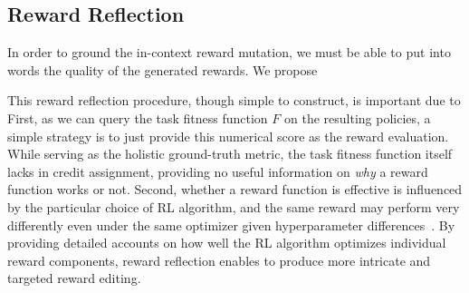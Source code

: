 \subsection{Reward Reflection}
\label{sec:reward-reflection}
In order to ground the in-context reward mutation, we must be able to put into words the quality of the generated rewards. We propose 







This reward reflection procedure, though simple to construct, is important due to  First, as we can query the task fitness function $F$ on the resulting policies, a simple strategy is to just provide this numerical score as the reward evaluation. While serving as the holistic ground-truth metric, the task fitness function itself lacks in credit assignment, providing no useful information on \textit{why} a reward function works or not. Second, whether a reward function is effective is influenced by the particular choice of RL algorithm, and the same reward may perform very differently even under the same optimizer given hyperparameter differences~\citep{henderson2018deep, agarwal2021deep}. By providing detailed accounts on how well the RL algorithm optimizes individual reward components, reward reflection enables \ourmethod to produce more intricate and targeted reward editing. 













